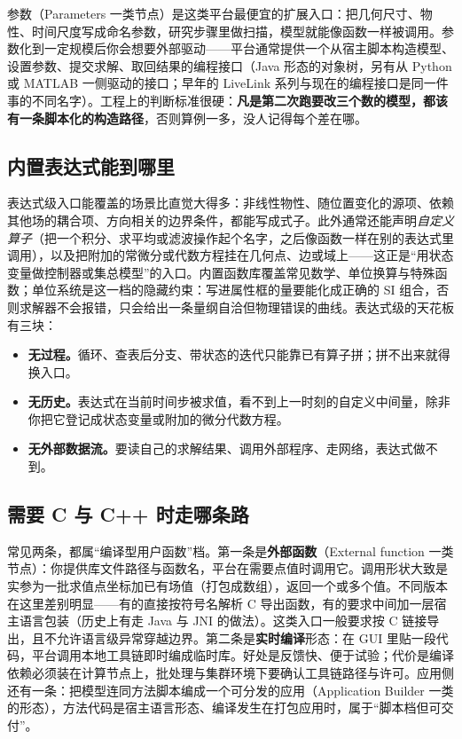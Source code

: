 \documentclass[12pt,a4paper,fontset=fandol]{ctexbook}
\newcommand{\Lang}[1]{\textsf{#1}}
\newcommand{\CL}{\Lang{C}}
\newcommand{\CPP}{\Lang{C++}}
\newcommand{\PY}{\Lang{Python}}
\begin{document}
参数（Parameters 一类节点）是这类平台最便宜的扩展入口：把几何尺寸、物性、时间尺度写成命名参数，研究步骤里做扫描，模型就能像函数一样被调用。参数化到一定规模后你会想要外部驱动——平台通常提供一个从宿主脚本构造模型、设置参数、提交求解、取回结果的编程接口（Java 形态的对象树，另有从 \PY 或 MATLAB 一侧驱动的接口；早年的 LiveLink 系列与现在的编程接口是同一件事的不同名字）。工程上的判断标准很硬：\textbf{凡是第二次跑要改三个数的模型，都该有一条脚本化的构造路径}，否则算例一多，没人记得每个差在哪。

\subsection*{内置表达式能到哪里}

表达式级入口能覆盖的场景比直觉大得多：非线性物性、随位置变化的源项、依赖其他场的耦合项、方向相关的边界条件，都能写成式子。此外通常还能声明\emph{自定义算子}（把一个积分、求平均或滤波操作起个名字，之后像函数一样在别的表达式里调用），以及把附加的常微分或代数方程挂在几何点、边或域上——这正是``用状态变量做控制器或集总模型''的入口。内置函数库覆盖常见数学、单位换算与特殊函数；单位系统是这一档的隐藏约束：写进属性框的量要能化成正确的 SI 组合，否则求解器不会报错，只会给出一条量纲自洽但物理错误的曲线。表达式级的天花板有三块：

\begin{itemize}
\item \textbf{无过程。}循环、查表后分支、带状态的迭代只能靠已有算子拼；拼不出来就得换入口。
\item \textbf{无历史。}表达式在当前时间步被求值，看不到上一时刻的自定义中间量，除非你把它登记成状态变量或附加的微分代数方程。
\item \textbf{无外部数据流。}要读自己的求解结果、调用外部程序、走网络，表达式做不到。
\end{itemize}

\subsection*{需要 \CL{} 与 \CPP{} 时走哪条路}

常见两条，都属``编译型用户函数''档。第一条是\textbf{外部函数}（External function 一类节点）：你提供库文件路径与函数名，平台在需要点值时调用它。调用形状大致是实参为一批求值点坐标加已有场值（打包成数组），返回一个或多个值。不同版本在这里差别明显——有的直接按符号名解析 C 导出函数，有的要求中间加一层宿主语言包装（历史上有走 Java 与 JNI 的做法）。这类入口一般要求按 C 链接导出，且不允许语言级异常穿越边界。第二条是\textbf{实时编译}形态：在 GUI 里贴一段代码，平台调用本地工具链即时编成临时库。好处是反馈快、便于试验；代价是编译依赖必须装在计算节点上，批处理与集群环境下要确认工具链路径与许可。应用侧还有一条：把模型连同方法脚本编成一个可分发的应用（Application Builder 一类的形态），方法代码是宿主语言形态、编译发生在打包应用时，属于``脚本档但可交付''。
\end{document}
